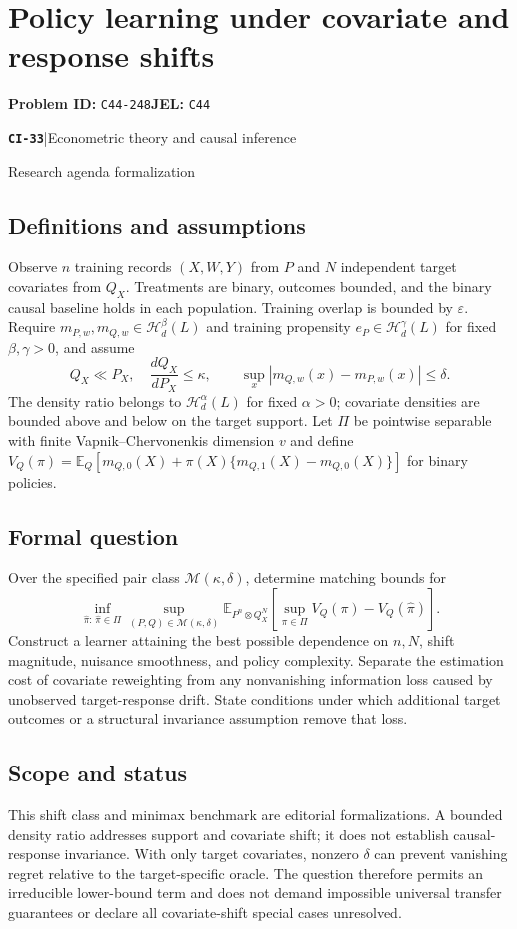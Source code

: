 \documentclass[11pt,a4paper]{article}
\newcommand{\E}{\mathbb E}
\newcommand{\entrymeta}[3]{{\sffamily\small\color{muted}\textbf{\texttt{#1}}\quad|\quad #2\par #3\par}}
\begin{document}
\section*{Policy learning under covariate and response shifts}
\textbf{Problem ID:} \texttt{C44-248}\quad \textbf{JEL:} \texttt{C44}\par
\label{problem:OP-0512}
\label{beyond:CI-33}
\entrymeta{CI-33}{Econometric theory and causal inference}{Research agenda formalization}
\subsection*{Definitions and assumptions}
Observe $n$ training records $(X,W,Y)$ from $P$ and $N$ independent target covariates from $Q_X$. Treatments are binary, outcomes bounded, and the binary causal baseline holds in each population. Training overlap is bounded by $\varepsilon$. Require $m_{P,w},m_{Q,w}\in\mathcal H_d^\beta(L)$ and training propensity $e_P\in\mathcal H_d^\gamma(L)$ for fixed $\beta,\gamma>0$, and assume
\[
 Q_X\ll P_X,\quad \frac{dQ_X}{dP_X}\leq\kappa,
 \qquad \sup_x|m_{Q,w}(x)-m_{P,w}(x)|\leq\delta.
\]
The density ratio belongs to $\mathcal H_d^\alpha(L)$ for fixed $\alpha>0$; covariate densities are bounded above and below on the target support. Let $\Pi$ be pointwise separable with finite Vapnik--Chervonenkis dimension $v$ and define $V_Q(\pi)=\E_Q[m_{Q,0}(X)+\pi(X)\{m_{Q,1}(X)-m_{Q,0}(X)\}]$ for binary policies.
\subsection*{Formal question}
Over the specified pair class $\mathcal M(\kappa,\delta)$, determine matching bounds for
\[
 \inf_{\widehat\pi:\,\widehat\pi\in\Pi}\sup_{(P,Q)\in\mathcal M(\kappa,\delta)}
 \E_{P^n\otimes Q_X^N}
 \left[\sup_{\pi\in\Pi}V_Q(\pi)-V_Q(\widehat\pi)\right].
\]
Construct a learner attaining the best possible dependence on $n,N$, shift magnitude, nuisance smoothness, and policy complexity. Separate the estimation cost of covariate reweighting from any nonvanishing information loss caused by unobserved target-response drift. State conditions under which additional target outcomes or a structural invariance assumption remove that loss.
\subsection*{Scope and status}
This shift class and minimax benchmark are editorial formalizations. A bounded density ratio addresses support and covariate shift; it does not establish causal-response invariance. With only target covariates, nonzero $\delta$ can prevent vanishing regret relative to the target-specific oracle. The question therefore permits an irreducible lower-bound term and does not demand impossible universal transfer guarantees or declare all covariate-shift special cases unresolved.
\end{document}
